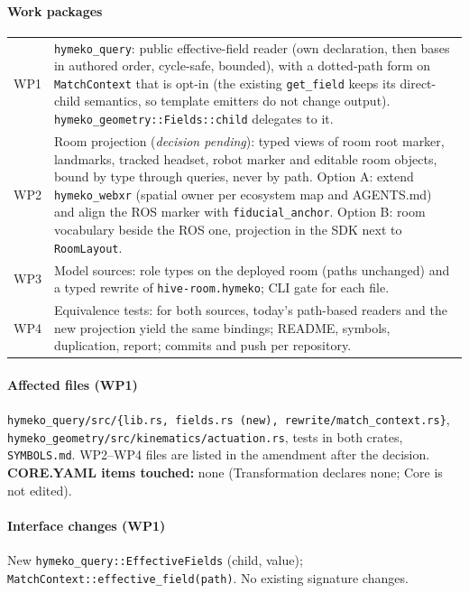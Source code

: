 \documentclass[11pt]{article}
\begin{document}
\begin{center}\end{center}

\paragraph{Work packages}
\begin{longtable}{p{10mm}p{150mm}}
WP1&\texttt{hymeko\_query}: public effective-field reader (own declaration, then bases in
authored order, cycle-safe, bounded), with a dotted-path form on \texttt{MatchContext} that is
opt-in (the existing \texttt{get\_field} keeps its direct-child semantics, so template emitters
do not change output). \texttt{hymeko\_geometry::Fields::child} delegates to it.\\
WP2&Room projection (\emph{decision pending}): typed views of room root marker, landmarks,
tracked headset, robot marker and editable room objects, bound by type through queries, never by
path. Option A: extend \texttt{hymeko\_webxr} (spatial owner per ecosystem map and AGENTS.md) and
align the ROS marker with \texttt{fiducial\_anchor}. Option B: room vocabulary beside the ROS one,
projection in the SDK next to \texttt{RoomLayout}.\\
WP3&Model sources: role types on the deployed room (paths unchanged) and a typed rewrite of
\texttt{hive-room.hymeko}; CLI gate for each file.\\
WP4&Equivalence tests: for both sources, today's path-based readers and the new projection yield
the same bindings; README, symbols, duplication, report; commits and push per repository.\\
\end{longtable}

\paragraph{Affected files (WP1)} \texttt{hymeko\_query/src/\{lib.rs, fields.rs (new), rewrite/match\_context.rs\}},
\texttt{hymeko\_geometry/src/kinematics/actuation.rs}, tests in both crates, \texttt{SYMBOLS.md}.
WP2--WP4 files are listed in the amendment after the decision.
\textbf{CORE.YAML items touched:} none (Transformation declares none; Core is not edited).

\paragraph{Interface changes (WP1)} New \texttt{hymeko\_query::EffectiveFields} (child, value);
\texttt{MatchContext::effective\_field(path)}. No existing signature changes.
\end{document}
